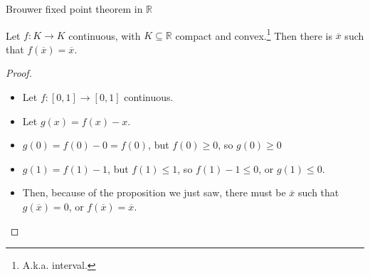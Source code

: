 \documentclass[aspectratio=169]{beamer}
\begin{document}
\begin{frame}{Brouwer fixed point theorem in $\mathbb{R}$}

    \begin{theorem}
    Let $f:K\rightarrow K$ continuous, with $K\subseteq\mathbb{R}$ compact and convex.\footnote{A.k.a. interval.} Then there is $\overline{x}$ such that $f(\overline{x})=\overline{x}$.
    \end{theorem}
    \begin{proof}
    \begin{itemize}
        \item Let $f:[0,1]\rightarrow[0,1]$ continuous.
        \item Let $g(x)=f(x)-x$.
        \item $g(0)=f(0)-0=f(0)$, but $f(0)\geq0$, so $g(0)\geq 0$
        \item $g(1)=f(1)-1$, but $f(1)\leq1$, so $f(1)-1\leq0$, or $g(1)\leq 0$.
        \item Then, because of the proposition we just saw, there must be $\overline{x}$ such that $g(\overline{x})=0$, or $f(\overline{x})=\overline{x}$.
    \end{itemize}
    \end{proof}
\end{frame}
\end{document}
